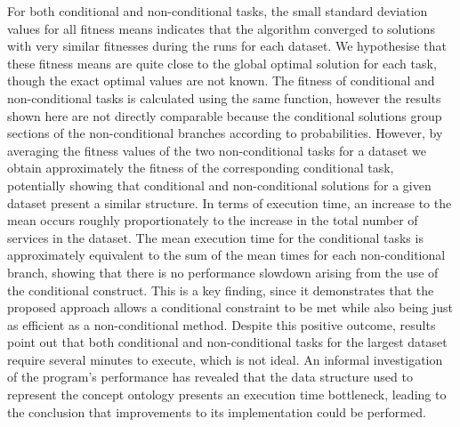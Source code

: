 \documentclass[conference]{IEEEtran}
\begin{document}
For both conditional and non-conditional tasks, the small standard deviation values for all fitness means indicates that the algorithm converged to solutions with very similar fitnesses during the runs for each dataset. We hypothesise that these fitness means are quite close to the global optimal solution for each task, though the exact optimal values are not known. The fitness  of conditional and non-conditional tasks is calculated using the same function, however the results shown here are not directly comparable because the conditional solutions group sections of the non-conditional branches according to probabilities. However, by averaging the fitness values of the two non-conditional tasks for a dataset we obtain approximately the fitness of the corresponding conditional task, potentially showing that conditional and non-conditional solutions for a given dataset present a similar structure. In terms of execution time, an increase to the mean occurs roughly proportionately to the increase in the total number of services in the dataset. The mean execution time for the conditional tasks is approximately equivalent to the sum of the mean times for each non-conditional branch, showing that there is no performance slowdown arising from the use of the conditional construct. This is a key finding, since it demonstrates that the proposed approach allows a conditional constraint to be met while also being just as efficient as a non-conditional method. Despite this positive outcome, results point out that both conditional and non-conditional tasks for the largest dataset require several minutes to execute, which is not ideal. An informal investigation of the program's performance has revealed that the data structure used to represent the concept ontology presents an execution time bottleneck, leading to the conclusion that improvements to its implementation could be performed.
\end{document}
